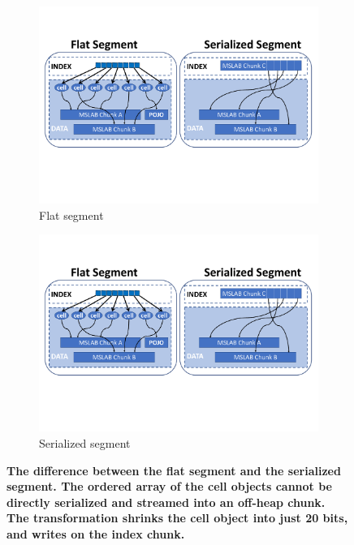 \begin{figure}[tb]

  \centering
  
  \begin{subfigure}[t]{0.65\columnwidth}
      \includegraphics[width=\figw]{flat-serializing.pdf}
      \caption[]{Flat segment}
    \label{fig:on-heap:flat}  
  \end{subfigure}   
  \begin{subfigure}[t]{0.65\columnwidth}
      \includegraphics[width=\figw]{serialized-serializing.pdf}
      \caption[]{Serialized segment}
    \label{fig:on-heap:ser}
  \end{subfigure}

\caption{\textbf{The difference between the flat segment and the serialized segment. The ordered array of the cell objects cannot be directly serialized and streamed into an off-heap chunk. The transformation shrinks the cell object into just 20 bits, and writes on the index chunk.} }
\label{fig:on-heap}
\end{figure}


